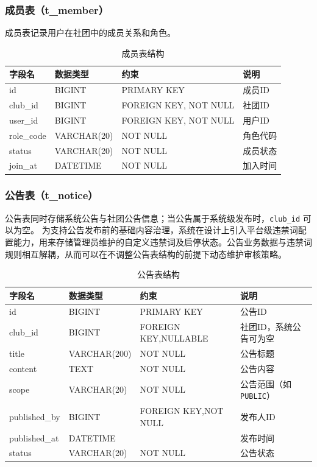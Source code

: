 \subsubsection{成员表（t\_member）}

成员表记录用户在社团中的成员关系和角色。

\begin{table}[H]
\centering
\caption{成员表结构}
\begin{tabular}{llll}
\toprule
字段名 & 数据类型 & 约束 & 说明 \\
\midrule
id & BIGINT & PRIMARY KEY & 成员ID \\
club\_id & BIGINT & FOREIGN KEY, NOT NULL & 社团ID \\
user\_id & BIGINT & FOREIGN KEY, NOT NULL & 用户ID \\
role\_code & VARCHAR(20) & NOT NULL & 角色代码 \\
status & VARCHAR(20) & NOT NULL & 成员状态 \\
join\_at & DATETIME & NOT NULL & 加入时间 \\
\bottomrule
\end{tabular}
\end{table}

\subsubsection{公告表（t\_notice）}

公告表同时存储系统公告与社团公告信息；当公告属于系统级发布时，\texttt{club\_id} 可以为空。
为支持公告发布前的基础内容治理，系统在设计上引入平台级违禁词配置能力，用来存储管理员维护的自定义违禁词及启停状态。公告业务数据与违禁词规则相互解耦，从而可以在不调整公告表结构的前提下动态维护审核策略。

\begin{table}[H]
\centering
\caption{公告表结构}
\begingroup
\setlength{\tabcolsep}{4pt}
\small
\begin{tabular}{>{\raggedright\arraybackslash}p{} >{\raggedright\arraybackslash}p{} >{\raggedright\arraybackslash}p{} >{\raggedright\arraybackslash}p{}}
\toprule
字段名 & 数据类型 & 约束 & 说明 \\
\midrule
id & BIGINT & PRIMARY KEY & 公告ID \\
club\_\allowbreak{}id & BIGINT & FOREIGN KEY,\allowbreak NULLABLE & 社团ID，系统公告可为空 \\
title & VARCHAR\allowbreak(200) & NOT NULL & 公告标题 \\
content & TEXT & NOT NULL & 公告内容 \\
scope & VARCHAR\allowbreak(20) & NOT NULL & 公告范围（如 \texttt{PUBLIC}） \\
published\_\allowbreak{}by & BIGINT & FOREIGN KEY,\allowbreak NOT NULL & 发布人ID \\
published\_\allowbreak{}at & DATETIME & & 发布时间 \\
status & VARCHAR(20) & NOT NULL & 公告状态 \\
\bottomrule
\end{tabular}
\endgroup
\end{table}

